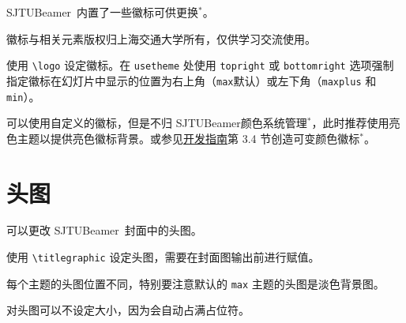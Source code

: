 \documentclass[
    UTF8,
    heading=true,
    12pt,
    a4paper
]{ctexrep}
\def\themename{\textsf{SJTUBeamer}}
\begin{document}
\themename\ 内置了一些徽标可供更换$^*$。

\faInfoCircle 徽标与相关元素版权归上海交通大学所有，仅供学习交流使用。

\begin{tcbitemize}[raster rows=2, raster columns=3, raster every box/.style={center title, valign=center, halign=center,fonttitle=\ttfamily,colback=white}]
  \tcbitem[raster multicolumn=2,blankest]
  \begin{tcbitemize}[raster columns=2]
    \tcbitem[title={\textbackslash{}cnlogo}] \moveleft 0.3cm\hbox{\resizebox{!}{1cm}{\cnlogo}}
    \tcbitem[title={\textbackslash{}enlogo}] \moveleft 0.3cm\hbox{\resizebox{!}{1cm}{\enlogo}}
    \tcbitem[title={\textbackslash{}sjtubadge},height=3.5cm] \resizebox{!}{2cm}{\sjtubadge\ }
    \tcbitem[title={\textbackslash{}dlogo},height=3.5cm] \resizebox{3cm}{!}{\dlogo\ }
  \end{tcbitemize}
  \tcbitem[title={\textbackslash{}vlogo}] \resizebox{!}{4.8cm}{\vlogo\ }
\end{tcbitemize}


\begin{commentlist}
  \item 使用 \texttt{\textbackslash{}logo} 设定徽标。在 \verb"usetheme" 处使用 \verb"topright" 或 \verb"bottomright" 选项强制指定徽标在幻灯片中显示的位置为右上角（\verb"max"默认）或左下角（\verb"maxplus" 和 \verb"min"）。
  \item 可以使用自定义的徽标，但是不归 \themename 颜色系统管理$^*$，此时推荐使用亮色主题以提供亮色徽标背景。或参见\href{run:sjtubeamerdevguide.pdf}{开发指南}第 3.4 节创造可变颜色徽标$^*$。
\end{commentlist}

\chapter{头图}

可以更改 \themename\ 封面中的头图。


\begin{commentlist}
  \item 使用 \texttt{\textbackslash{}titlegraphic} 设定头图，需要在封面图输出前进行赋值。
  \item 每个主题的头图位置不同，特别要注意默认的 \texttt{max} 主题的头图是淡色背景图。
  \item 对头图可以不设定大小，因为会自动占满占位符。
\end{commentlist}
\end{document}

